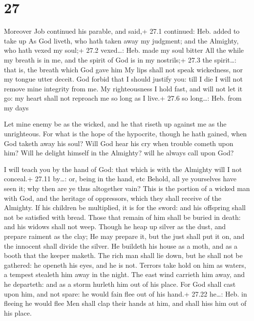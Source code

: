\hypertarget{section-26}{%
\section{27}\label{section-26}}

 Moreover Job continued his parable, and said,+ 27.1
continued: Heb. added to take up  As God liveth, who hath
taken away my judgment; and the Almighty, who hath vexed my soul;+ 27.2
vexed\ldots: Heb. made my soul bitter  All the while my
breath is in me, and the spirit of God is in my nostrils;+ 27.3 the
spirit\ldots: that is, the breath which God gave him  My
lips shall not speak wickedness, nor my tongue utter deceit.
 God forbid that I should justify you: till I die I will not
remove mine integrity from me.  My righteousness I hold
fast, and will not let it go: my heart shall not reproach me so long as
I live.+ 27.6 so long\ldots: Heb. from my days

 Let mine enemy be as the wicked, and he that riseth up
against me as the unrighteous.  For what is the hope of the
hypocrite, though he hath gained, when God taketh away his soul?
 Will God hear his cry when trouble cometh upon him?
 Will he delight himself in the Almighty? will he always
call upon God?

 I will teach you by the hand of God: that which is with
the Almighty will I not conceal.+ 27.11 by\ldots: or, being in the hand,
etc  Behold, all ye yourselves have seen it; why then are
ye thus altogether vain?  This is the portion of a wicked
man with God, and the heritage of oppressors, which they shall receive
of the Almighty.  If his children be multiplied, it is for
the sword: and his offspring shall not be satisfied with bread.
 Those that remain of him shall be buried in death: and his
widows shall not weep.  Though he heap up silver as the
dust, and prepare raiment as the clay;  He may prepare it,
but the just shall put it on, and the innocent shall divide the silver.
 He buildeth his house as a moth, and as a booth that the
keeper maketh.  The rich man shall lie down, but he shall
not be gathered: he openeth his eyes, and he is not. 
Terrors take hold on him as waters, a tempest stealeth him away in the
night.  The east wind carrieth him away, and he departeth:
and as a storm hurleth him out of his place.  For God shall
cast upon him, and not spare: he would fain flee out of his hand.+ 27.22
he\ldots: Heb. in fleeing he would flee  Men shall clap
their hands at him, and shall hiss him out of his place.

